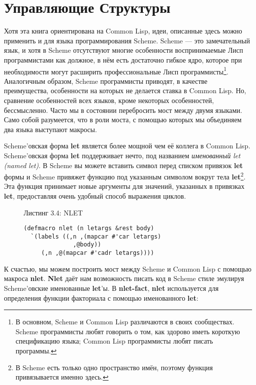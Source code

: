 \section{Управляющие Структуры}\label{section_control_structures}

Хотя эта книга ориентирована на Common Lisp, идеи, описанные здесь можно применить и для языка программирования Scheme. Scheme --- это замечательный язык, и хотя в Scheme отсутствуют многие особенности воспринимаемые Лисп программистами как должное, в нём есть достаточно гибкое ядро, которое при необходимости могут расширить профессиональные Лисп программисты\footnote{В основном, Scheme и Common Lisp различаются в своих сообществах. Scheme программисты любят говорить о том, как здорово иметь короткую спецификацию языка; Common Lisp программисты любят писать программы.}. Аналогичным образом, Scheme программисты приводят, в качестве преимущества, особенности на которых не делается ставка в Common Lisp. Но, сравнение особенностей всех языков, кроме некоторых особенностей, бессмысленно. Часто мы в состоянии перебросить мост между двумя языками. Само собой разумеется, что в роли моста, с помощью которых мы объединяем два языка выступают макросы.

Scheme'овская форма \textbf{let} является более мощной чем её коллега в Common Lisp. Scheme'овская форма \textbf{let} поддерживает нечто, под названием \emph{именованный let (named let)}. В Scheme вы можете вставить символ перед списком привязок \textbf{let} формы и Scheme привяжет функцию под указанным символом вокруг тела \textbf{let}\footnote{В Scheme есть только одно пространство имён, поэтому функция привязывается именно здесь.}. Эта функция принимает новые аргументы для значений, указанных в привязках \textbf{let}, предоставляя очень удобный способ выражения циклов.

\begin{figure}Листинг 3.4: NLET\label{listing_3.4}
\listbegin
\begin{verbatim}
(defmacro nlet (n letargs &rest body)
  `(labels ((,n ,(mapcar #'car letargs)
              ,@body))
     (,n ,@(mapcar #'cadr letargs))))
\end{verbatim}
\listend
\end{figure}

К счастью, мы можем построить мост между Scheme и Common Lisp с помощью макроса \textbf{nlet}. \textbf{Nlet} даёт нам возможность писать код в Scheme стиле эмулируя Scheme'овские именованные \textbf{let}'ы. В \textbf{nlet-fact}, \textbf{nlet} используется для определения функции факториала с помощью именованного \textbf{let}:


